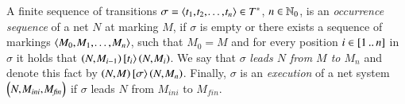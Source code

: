 A finite sequence of transitions $\sigma=\sequence{t_1,t_2,\ldots,t_n} \in \kleenestar{T}$, $n \in \mathbb{N}_0$, is an \emph{occurrence sequence} of a net $N$ at marking $M$, if $\sigma$ is empty or there exists a sequence of markings $\sequence{M_0,M_1,\ldots,M_n}$, such that $M_0=M$ and for every position $i \in {\ensuremath \left[1 \,..\, n\right]}$ in $\sigma$ it holds that $\occurrence{N}{M_{i-1}}{t_i}{M_i}$.
We say that $\sigma$ \emph{leads $N$ from $M$ to $M_n$} and denote this fact by $\leadsfromto{N}{M}{\sigma}{M_n}$.
Finally, $\sigma$ is an \emph{execution} of a net system $\tuple{N,M_\mathit{ini},M_\mathit{fin}}$ if $\sigma$ leads $N$ from $M_\mathit{ini}$ to $M_\mathit{fin}$.